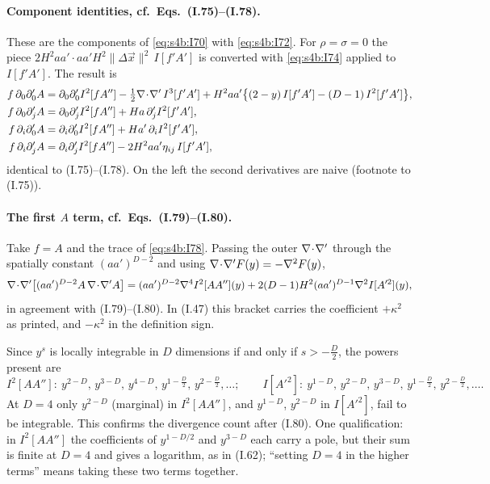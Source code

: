 \documentclass[aps,prd,onecolumn,10pt,nofootinbib,floatfix]{revtex4-2}
\newcommand{\eqI}[1]{(I.#1)}
\begin{document}
\paragraph*{Component identities, cf.\ Eqs.~(I.75)--(I.78).}
These are the components of \eqref{eq:s4b:I70} with \eqref{eq:s4b:I72}. For $\rho=\sigma=0$ the piece
$2H^2aa'\cdot aa'H^2\|\Delta\vec x\|^2\,I[f'A']$ is converted with \eqref{eq:s4b:I74} applied to $I[f'A']$. The result is
\begin{align}
f\,\partial_0\partial'_0A&=\partial_0\partial'_0I^2[fA'']-\tfrac12\nabla\!\cdot\!\nabla'\,I^3[f'A']
+H^2aa'\big\{(2-y)\,I[f'A']-(D-1)\,I^2[f'A']\big\},\label{eq:s4b:I75}\\
f\,\partial_0\partial'_jA&=\partial_0\partial'_jI^2[fA'']+Ha\,\partial'_jI^2[f'A'],\label{eq:s4b:I76}\\
f\,\partial_i\partial'_0A&=\partial_i\partial'_0I^2[fA'']+Ha'\,\partial_iI^2[f'A'],\label{eq:s4b:I77}\\
f\,\partial_i\partial'_jA&=\partial_i\partial'_jI^2[fA'']-2H^2aa'\eta_{ij}\,I[f'A'],\label{eq:s4b:I78}
\end{align}
identical to \eqI{75}--\eqI{78}. On the left the second derivatives are naive (footnote to \eqI{75}).

\paragraph*{The first $A$ term, cf.\ Eqs.~(I.79)--(I.80).}
Take $f=A$ and the trace of \eqref{eq:s4b:I78}. Passing the outer $\nabla\!\cdot\!\nabla'$ through the spatially constant
$(aa')^{D-2}$ and using $\nabla\!\cdot\!\nabla' F(y)=-\nabla^2F(y)$,
\begin{equation}
\nabla\!\cdot\!\nabla'\big[(aa')^{D-2}A\,\nabla\!\cdot\!\nabla' A\big]=(aa')^{D-2}\nabla^4I^2[AA''](y)+2(D-1)H^2(aa')^{D-1}\nabla^2I[A'^2](y),
\label{eq:s4b:I80}
\end{equation}
in agreement with \eqI{79}--\eqI{80}. In \eqI{47} this bracket carries the coefficient $+\kappa^2$ as printed, and
$-\kappa^2$ in the definition sign.

Since $y^s$ is locally integrable in $D$ dimensions if and only if $s>-\frac D2$, the powers present are
\begin{equation}
I^2[AA'']:\ y^{2-D},\,y^{3-D},\,y^{4-D},\,y^{1-\frac D2},\,y^{2-\frac D2},\dots;\qquad
I[A'^2]:\ y^{1-D},\,y^{2-D},\,y^{3-D},\,y^{1-\frac D2},\,y^{2-\frac D2},\dots.
\end{equation}
At $D=4$ only $y^{2-D}$ (marginal) in $I^2[AA'']$, and $y^{1-D}$, $y^{2-D}$ in $I[A'^2]$, fail to be integrable. This
confirms the divergence count after \eqI{80}. One qualification: in $I^2[AA'']$ the coefficients of $y^{1-D/2}$ and
$y^{3-D}$ each carry a pole, but their sum is finite at $D=4$ and gives a logarithm, as in \eqI{62}; ``setting $D=4$
in the higher terms'' means taking these two terms together.
\end{document}

